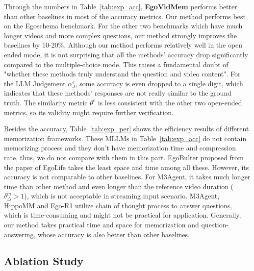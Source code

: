 Through the numbers in Table~\ref{tab:exp_acc}, \textbf{EgoVidMem} performs better than other baselines in most of the accuracy metrics.
Our method performs best on the Egoschema benchmark.
For the other two benchmarks which have much longer videos and more complex questions, our method strongly improves the baselines by 10-20\%.
Although our method performs relatively well in the open ended mode, it is not surprising that all the methods' accuracy drop significantly compared to the multiple-choice mode. This raises a fundamental doubt of "whether these methods truly understand the question and video content".
For the LLM Judgement $\alpha^e_J$, some accuracy is even dropped to a single digit, which indicates that these methods' responses are not really similar to the ground truth.
The similarity metric $\theta^e$ is less consistent with the other two open-ended metrics, so its validity might require further verification. 





Besides the accuracy, Table~\ref{tab:exp_per} shows the efficiency results of different memorization frameworks. These MLLMs in Table~\ref{tab:exp_acc} do not contain memorizing process and they don't have memorization time and compression rate, thus, we do not compare with them in this part.
EgoBulter\cite{yang2025EgoLife} proposed from the paper of EgoLife takes the least space and time among all these. However, its accuracy is not comparable to other baselines.
For M3Agent\cite{long2025M3Agent}, it takes much longer time than other method and even longer than the reference video duration ($\overline{\delta^m_\Delta} > 1$), which is not acceptable in streaming input scenario.
M3Agent\cite{long2025M3Agent}, HippoMM\cite{lin2025HippoMM} and Ego-R1\cite{tian2025EgoR1} utilize chain of thought process to answer questions, which is time-consuming and might not be practical for application.
Generally, our method takes practical time and space for memorization and question-answering, whose accuracy is also better than other baselines.

\subsection{Ablation Study}\label{sub:exp_ablation}


